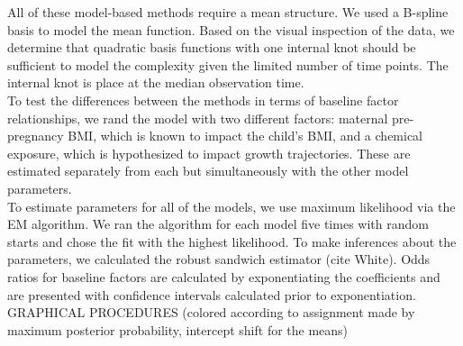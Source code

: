 All of these model-based methods require a mean structure. We used a B-spline basis to model the mean function. Based on the visual inspection of the data, we determine that quadratic basis functions with one internal knot should be sufficient to model the complexity given the limited number of time points.  The internal knot is place at the median observation time. \\

To test the differences between the methods in terms of baseline factor relationships, we rand the model with two different factors: maternal pre-pregnancy BMI, which is known to impact the child's BMI, and a chemical exposure, which is hypothesized to impact growth trajectories. These are estimated separately from each but simultaneously with the other model parameters.\\

To estimate parameters for all of the models, we use maximum likelihood via the EM algorithm. We ran the algorithm for each model five times with random starts and chose the fit with the highest likelihood. To make inferences about the parameters, we calculated the robust sandwich estimator (cite White). Odds ratios for baseline factors are calculated by exponentiating the coefficients and are presented with confidence intervals calculated prior to exponentiation.\\

GRAPHICAL PROCEDURES (colored according to assignment made by maximum posterior probability, intercept shift for the means)\\

